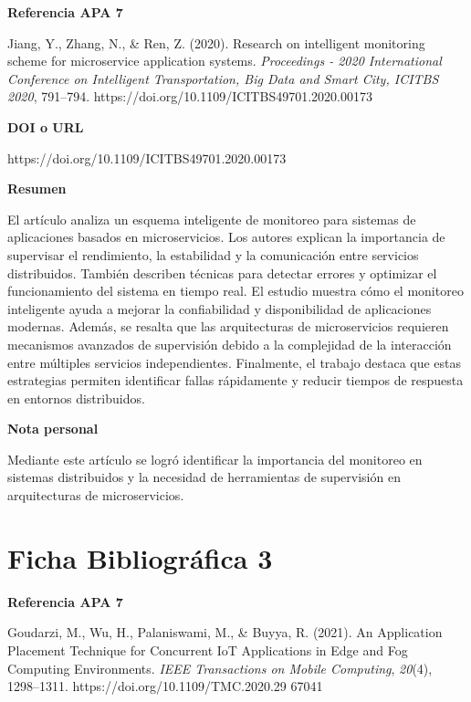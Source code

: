 \documentclass[12pt]{article}
\begin{document}
\textbf{Referencia APA 7}

Jiang, Y., Zhang, N., \& Ren, Z. (2020). Research on intelligent monitoring scheme for microservice application systems. \textit{Proceedings - 2020 International Conference on Intelligent Transportation, Big Data and Smart City, ICITBS 2020}, 791–794. https://doi.org/10.1109/ICITBS49701.2020.00173

\vspace{0.3cm}

\textbf{DOI o URL}

https://doi.org/10.1109/ICITBS49701.2020.00173  

\vspace{0.3cm}

\textbf{Resumen}

El artículo analiza un esquema inteligente de monitoreo para sistemas de aplicaciones basados en microservicios. Los autores explican la importancia de supervisar el rendimiento, la estabilidad y la comunicación entre servicios distribuidos. También describen técnicas para detectar errores y optimizar el funcionamiento del sistema en tiempo real. El estudio muestra cómo el monitoreo inteligente ayuda a mejorar la confiabilidad y disponibilidad de aplicaciones modernas. Además, se resalta que las arquitecturas de microservicios requieren mecanismos avanzados de supervisión debido a la complejidad de la interacción entre múltiples servicios independientes. Finalmente, el trabajo destaca que estas estrategias permiten identificar fallas rápidamente y reducir tiempos de respuesta en entornos distribuidos.

\vspace{0.3cm}

\textbf{Nota personal}

Mediante este artículo se logró identificar la importancia del monitoreo en sistemas distribuidos y la necesidad de herramientas de supervisión en arquitecturas de microservicios. 



\section*{Ficha Bibliográfica 3}

\textbf{Referencia APA 7}

Goudarzi, M., Wu, H., Palaniswami, M., \& Buyya, R. (2021). An Application Placement Technique for Concurrent IoT Applications in Edge and Fog Computing Environments. \textit{IEEE Transactions on Mobile Computing}, \textit{20}(4), 1298–1311. https://doi.org/10.1109/TMC.2020.29
67041
\end{document}
